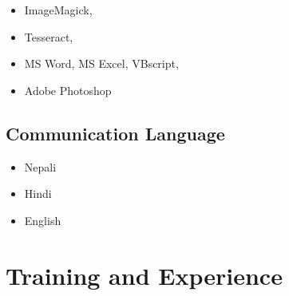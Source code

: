 \documentclass[11pt, a4paper]{awesome-cv}
\providecommand{\tightlist}{%
	\setlength{\itemsep}{0pt}\setlength{\parskip}{0pt}}
\begin{document}
\begin{multicols}{2}
\begin{itemize}
\item ImageMagick,
\item Tesseract,
\item MS Word, MS Excel, VBscript,
\item Adobe Photoshop
\end{itemize}
\end{multicols}

\hypertarget{communication-language}{%
\subsection{Communication Language}\label{communication-language}}

\begin{itemize}
\tightlist
\item
  Nepali
\item
  Hindi
\item
  English
\end{itemize}

\hypertarget{training-and-experience}{%
\section{Training and Experience}\label{training-and-experience}}
\end{document}
